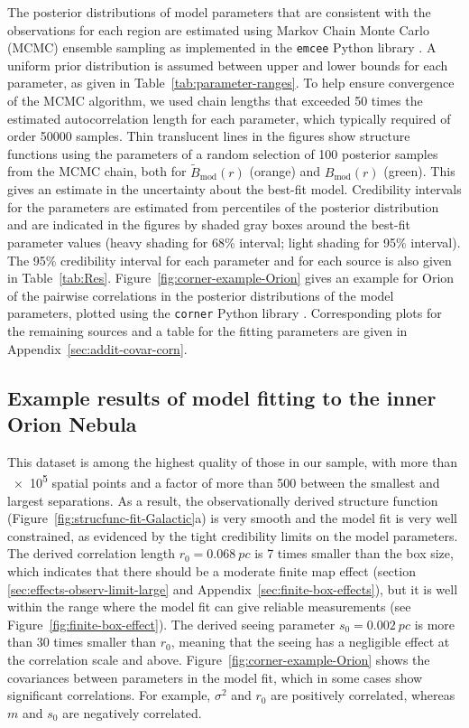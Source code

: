 \documentclass[fleqn,usenatbib, useAMS, a4paper]{mnras}
\newcommand\model{\ensuremath{_{\mathrm{mod}}}}
\begin{document}
The posterior distributions of model parameters
that are consistent with the observations for each region are estimated
using Markov Chain Monte Carlo (MCMC) ensemble sampling \citep{2010CAMCS...5...65G}
as implemented in the \texttt{emcee} Python library \citep{2013PASP..125..306F}.
A uniform prior distribution is assumed between upper and lower bounds
for each parameter, as given in Table~\ref{tab:parameter-ranges}.
To help ensure convergence of the MCMC algorithm,
we used chain lengths that exceeded \num{50} times the
estimated autocorrelation length for each parameter,
which typically required of order \num{50000} samples.
Thin translucent lines in the figures show structure functions using the parameters of
a random selection of \num{100} posterior samples from the MCMC chain,
both for \(\tilde{B}\model(r)\) (orange) and \(B\model(r)\) (green).
This gives an estimate in the uncertainty about the best-fit model.
Credibility intervals for the parameters are estimated from percentiles
of the posterior distribution and are indicated in the figures by shaded gray boxes
around the best-fit parameter values
(heavy shading for 68\% interval; light shading for 95\% interval).
The 95\% credibility interval for each parameter and for each source
is also given in Table~\ref{tab:Res}.
Figure~\ref{fig:corner-example-Orion} gives an example for Orion of
the pairwise correlations in the posterior distributions of the model parameters,
plotted using the \texttt{corner} Python library \citep{2017ascl.soft02002F}.
Corresponding plots for the remaining sources and a table for the fitting parameters are given in Appendix~\ref{sec:addit-covar-corn}.


\subsection{Example results of model fitting to the inner Orion Nebula}
\label{sec:example-results-orion}

This dataset is among the highest quality of those in our sample,
with more than \num{e5} spatial points and a factor of more than \num{500}
between the smallest and largest separations.
As a result, the observationally derived structure function (Figure~\ref{fig:strucfunc-fit-Galactic}a)
is very smooth and the model fit is very well constrained,
as evidenced by the tight credibility limits on the model parameters.
The derived correlation length \(r_0 = \SI{0.068}{pc}\) is \num{7} times smaller
than the box size, which indicates that there should be a moderate finite map effect
(section \ref{sec:effects-observ-limit-large} and Appendix~\ref{sec:finite-box-effects}),
but it is well within the range where the model fit can give reliable measurements
(see Figure~\ref{fig:finite-box-effect}).
The derived seeing parameter \(s_0 = \SI{0.002}{pc}\) is more than \num{30} times smaller
than \(r_0\), meaning that the seeing has a negligible effect at the correlation scale and above.
Figure~\ref{fig:corner-example-Orion}  shows  the covariances  between
parameters  in the  model fit,
which in some cases show significant correlations.
For example, \(\sigma^2\) and \(r_0\) are positively correlated,
whereas \(m\) and \(s_0\) are negatively correlated. 
\end{document}
